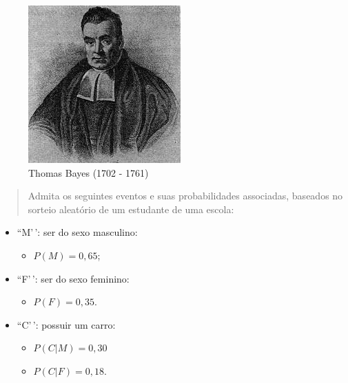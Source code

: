 \documentclass[
]{book}
\providecommand{\tightlist}{%
  \setlength{\itemsep}{0pt}\setlength{\parskip}{0pt}}
\begin{document}
\begin{figure}

{\centering \includegraphics[width=0.8\linewidth]{images4/thomas_bayes} 

}

\caption{Thomas Bayes (1702 - 1761)}\label{fig:unnamed-chunk-64}
\end{figure}

\begin{quote}
Admita os seguintes eventos e suas probabilidades associadas, baseados no sorteio aleatório de um estudante de uma escola:
\end{quote}

\hfill\break

\begin{itemize}
\tightlist
\item
  ``M'\,': ser do sexo masculino:

  \begin{itemize}
  \tightlist
  \item
    \(P(M)=0,65\);
  \end{itemize}
\item
  ``F'\,': ser do sexo feminino:

  \begin{itemize}
  \tightlist
  \item
    \(P(F)=0,35\).
  \end{itemize}
\item
  ``C'\,': possuir um carro:

  \begin{itemize}
  \tightlist
  \item
    \(P(C|M)=0,30\)
  \item
    \(P(C|F)=0,18\).
  \end{itemize}
\end{itemize}
\end{document}
